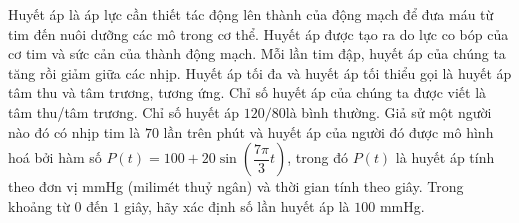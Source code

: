 \begin{bt}%
	Huyết áp là áp lực cần thiết tác động lên thành của động mạch để đưa máu từ tim đến nuôi dưỡng các mô trong cơ thể. Huyết áp được tạo ra do lực co bóp của cơ tim và sức cản của thành động mạch. Mỗi lần tim đập, huyết áp của chúng ta tăng rồi giảm giữa các nhịp. Huyết áp tối đa và huyết áp tối thiểu gọi là huyết áp tâm thu và tâm trương, tương ứng. Chỉ số huyết áp của chúng ta được viết là tâm thu/tâm trương. Chỉ số huyết áp $120 / 80 $là bình thường. Giả sử một người nào đó có nhịp tim là $70$ lần trên phút và huyết áp của người đó được mô hình hoá bởi hàm số $P(t)=100+20\sin \left(\dfrac{7\pi}{3}t\right)$, trong đó $P(t)$ là huyết áp tính theo đơn vị mmHg (milimét thuỷ ngân) và thời gian tính theo giây. Trong khoảng từ $0$ đến $1$ giây, hãy xác định số lần huyết áp là $100$ mmHg.
\end{bt}

